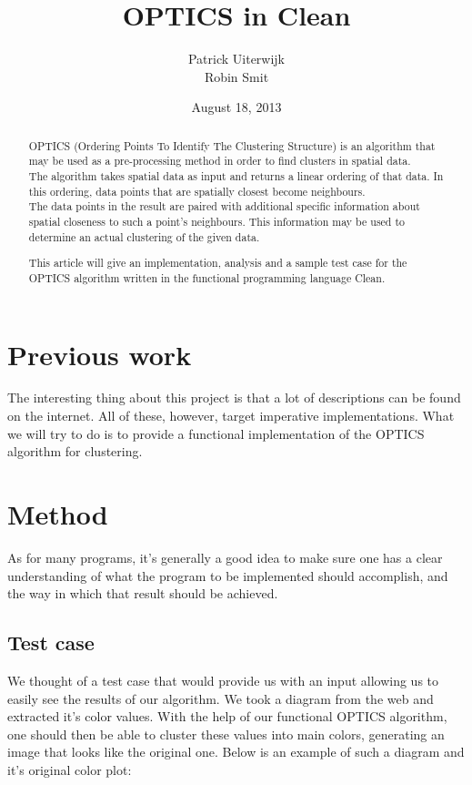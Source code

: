 \documentclass[12pt,a4paper]{article}
\title{OPTICS in Clean}
\date{August 18, 2013}
\author{Patrick Uiterwijk\\Robin Smit}
\begin{document}
\maketitle
\clearpage

\begin{abstract}
OPTICS (Ordering Points To Identify The Clustering Structure) is an algorithm that may be used as a pre-processing method in order to find clusters in spatial data.\\
The algorithm takes spatial data as input and returns a linear ordering of that data. In this ordering, data points that are spatially closest become neighbours.\\
The data points in the result are paired with additional specific information about spatial closeness to such a point's neighbours. This information may be used to determine an actual clustering of the given data.

This article will give an implementation, analysis and a sample test case for the OPTICS algorithm written in the functional programming language Clean.
\end{abstract}
\clearpage

\tableofcontents
\clearpage

\section{Previous work}
The interesting thing about this project is that a lot of descriptions can be found on the internet. All of these, however, target imperative implementations. What we will try to do is to provide a functional implementation of the OPTICS algorithm for clustering.

\clearpage
\section{Method}
As for many programs, it's generally a good idea to make sure one has a clear understanding of what the program to be implemented should accomplish, and the way in which that result should be achieved.

\subsection{Test case}
We thought of a test case that would provide us with an input allowing us to easily see the results of our algorithm. We took a diagram from the web and extracted it's color values. With the help of our functional OPTICS algorithm, one should then be able to cluster these values into main colors, generating an image that looks like the original one. Below is an example of such a diagram and it's original color plot:\\
\end{document}
